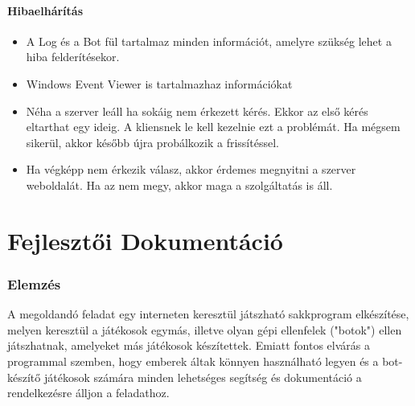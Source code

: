 \documentclass[twoside, a4paper, 12pt]{article}
\begin{document}
\subsection{Hibaelhárítás}
\begin{itemize}
	\item A Log és a Bot fül tartalmaz minden információt, amelyre szükség lehet a hiba felderítésekor.
	\item Windows Event Viewer is tartalmazhaz információkat
	\item Néha a szerver leáll ha sokáig nem érkezett kérés. Ekkor az első kérés eltarthat egy ideig. A kliensnek le kell kezelnie ezt a problémát. Ha mégsem sikerül, akkor később újra probálkozik a frissítéssel.
	\item Ha végképp nem érkezik válasz, akkor érdemes megnyitni a szerver weboldalát. Ha az nem megy, akkor maga a szolgáltatás is áll.
\end{itemize}






































\newpage
\part{Fejlesztői Dokumentáció}
\section{Elemzés}
A megoldandó feladat egy interneten keresztül játszható sakkprogram elkészítése, melyen keresztül a játékosok egymás, illetve olyan gépi ellenfelek ("botok") ellen játszhatnak, amelyeket más játékosok készítettek. Emiatt fontos elvárás a programmal szemben, hogy emberek áltak könnyen használható legyen és a bot-készítő játékosok számára minden lehetséges segítség és dokumentáció a rendelkezésre álljon a feladathoz.
\end{document}
